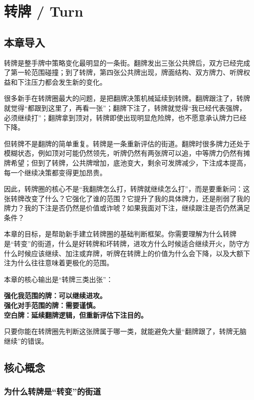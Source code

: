 \chapter{转牌 / Turn}

\section{本章导入}

转牌是整手牌中策略变化最明显的一条街。翻牌发出三张公共牌后，双方已经完成了第一轮范围碰撞；到了转牌，第四张公共牌出现，牌面结构、双方牌力、听牌权益和下注压力都会发生新的变化。

很多新手在转牌圈最大的问题，是把翻牌决策机械延续到转牌。翻牌跟注了，转牌就觉得“都跟到这里了，再看一张”；翻牌下注了，转牌就觉得“我已经代表强牌，必须继续打”；翻牌拿到顶对，转牌即使出现明显危险牌，也不愿意承认牌力已经下降。

但转牌不是翻牌的简单重复。转牌是一条重新评估的街道。翻牌时很多牌力还处于模糊状态，例如顶对可能仍然领先，听牌仍然有两张牌可以追，中等牌力仍然有摊牌希望；但到了转牌，公共牌增加，底池变大，剩余可发牌减少，下注成本提高，每一个继续决策都变得更加昂贵。

因此，转牌圈的核心不是“我翻牌怎么打，转牌就继续怎么打”，而是要重新问：这张转牌改变了什么？它强化了谁的范围？它提升了我的具体牌力，还是削弱了我的牌力？我的下注是否仍然是价值或诈唬？如果我面对下注，继续跟注是否仍然满足条件？

本章的目标，是帮助新手建立转牌圈的基础判断框架。你需要理解为什么转牌是“转变”的街道，什么是好转牌和坏转牌，进攻方什么时候适合继续开火，防守方什么时候应该继续、加注或弃牌，听牌在转牌上的价值为什么会下降，以及大额下注为什么往往意味着更极化的范围。

本章的核心输出是“转牌三类出张”：

\begin{center}
\textbf{强化我范围的牌：可以继续进攻。\\
强化对手范围的牌：需要谨慎。\\
空白牌：延续翻牌逻辑，但重新评估下注目的。}
\end{center}

只要你能在转牌圈先判断这张牌属于哪一类，就能避免大量“翻牌跟了，转牌无脑继续”的错误。

\section{核心概念}

\subsection{为什么转牌是“转变”的街道}

